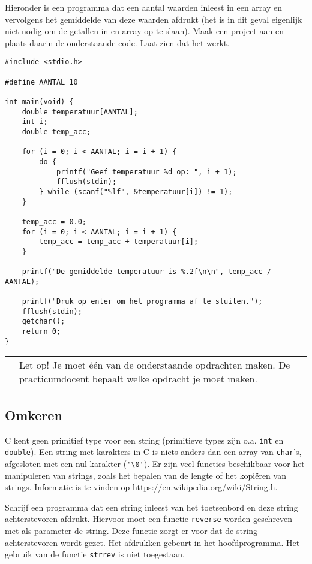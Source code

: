 \documentclass[a4paper,10pt,fleqn,twoside]{article}
\newcommand{\letop}{%
\vspace*{2ex}
\begin{mdframed}[outerlinewidth = 1 ,%
roundcorner = 4 pt,%
leftmargin = 40,%
rightmargin = 40,%
backgroundcolor = yellow!40,%
outerlinecolor = red!70!black,%
innertopmargin = \topskip,%
splittopskip = \topskip,%
]
\begin{tabularx}{\linewidth}{m{1cm}X}
\Large\leftpointright & Let op! Je moet één van de onderstaande opdrachten maken. De practicumdocent bepaalt welke opdracht je moet maken.
\end{tabularx}
\end{mdframed}
}
\begin{document}

Hieronder is een programma dat een aantal waarden inleest in een array en vervolgens het gemiddelde van deze waarden afdrukt (het is in dit geval eigenlijk niet nodig om de getallen in en array op te slaan). Maak een project aan en plaats daarin de onderstaande code. Laat zien dat het werkt.


\begin{lstlisting}
#include <stdio.h>

#define AANTAL 10

int main(void) {
    double temperatuur[AANTAL];
    int i;
    double temp_acc;

    for (i = 0; i < AANTAL; i = i + 1) {
        do {
            printf("Geef temperatuur %d op: ", i + 1);
            fflush(stdin);
        } while (scanf("%lf", &temperatuur[i]) != 1);
    }

    temp_acc = 0.0;
    for (i = 0; i < AANTAL; i = i + 1) {
        temp_acc = temp_acc + temperatuur[i];
    }

    printf("De gemiddelde temperatuur is %.2f\n\n", temp_acc / AANTAL);

    printf("Druk op enter om het programma af te sluiten.");
    fflush(stdin);
    getchar();
    return 0;
}
\end{lstlisting}

\letop

\subsection{Omkeren}
C kent geen primitief type voor een string (primitieve types zijn o.a. \lstinline|int| en \lstinline|double|). Een string met karakters in C is niets anders dan een array van \lstinline|char|’s, afgesloten met een nul-karakter (\lstinline|'\0'|). Er zijn veel functies beschikbaar voor het manipuleren van strings, zoals het bepalen van de lengte of het kopiëren van strings. Informatie is te vinden op \url{https://en.wikipedia.org/wiki/String.h}.

Schrijf een programma dat een string inleest van het toetsenbord en deze string achterstevoren afdrukt. Hiervoor moet een functie \lstinline|reverse| worden geschreven met als parameter de string. Deze functie zorgt er voor dat de string achterstevoren wordt gezet. Het afdrukken gebeurt in het hoofdprogramma. Het gebruik van de functie \lstinline|strrev| is niet toegestaan.
\end{document}
